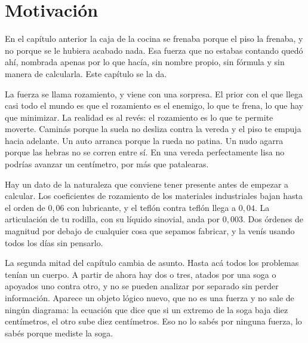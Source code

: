 \documentclass[11pt,openany]{book}
\newcommand{\sen}{\operatorname{sen}}
\renewcommand{\miNombre}{Pedro Villar}
\begin{document}
%
%


\section{Motivación}

\begin{motivacion}
En el capítulo anterior la caja de la cocina se frenaba porque el piso la frenaba, y no porque se le hubiera acabado nada. Esa fuerza que no estabas contando quedó ahí, nombrada apenas por lo que hacía, sin nombre propio, sin fórmula y sin manera de calcularla. Este capítulo se la da.
\end{motivacion}

La fuerza se llama rozamiento, y viene con una sorpresa. El prior con el que llega casi todo el mundo es que el rozamiento es el enemigo, lo que te frena, lo que hay que minimizar. La realidad es al revés: el rozamiento es lo que te permite moverte. Caminás porque la suela no desliza contra la vereda y el piso te empuja hacia adelante. Un auto arranca porque la rueda no patina. Un nudo agarra porque las hebras no se corren entre sí. En una vereda perfectamente lisa no podrías avanzar un centímetro, por más que patalearas.

Hay un dato de la naturaleza que conviene tener presente antes de empezar a calcular. Los coeficientes de rozamiento de los materiales industriales bajan hasta el orden de $0{,}06$ con lubricante, y el teflón contra teflón llega a $0{,}04$. La articulación de tu rodilla, con su líquido sinovial, anda por $0{,}003$. Dos órdenes de magnitud por debajo de cualquier cosa que sepamos fabricar, y la venís usando todos los días sin pensarlo.

La segunda mitad del capítulo cambia de asunto. Hasta acá todos los problemas tenían un cuerpo. A partir de ahora hay dos o tres, atados por una soga o apoyados uno contra otro, y no se pueden analizar por separado sin perder información. Aparece un objeto lógico nuevo, que no es una fuerza y no sale de ningún diagrama: la ecuación que dice que si un extremo de la soga baja diez centímetros, el otro sube diez centímetros. Eso no lo sabés por ninguna fuerza, lo sabés porque mediste la soga.
\end{document}
